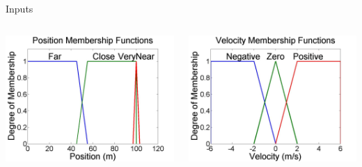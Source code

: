 \documentclass[]{beamer}
\begin{document}
\begin{frame}{Inputs}
    \begin{columns}
        \begin{column}{0.5\textwidth}
            \includegraphics[width=\textwidth]{media/image17}
        \end{column}
        \begin{column}{0.5\textwidth}
            \includegraphics[width=\textwidth]{media/image18}
        \end{column}
    \end{columns}
\end{frame}
\end{document}

